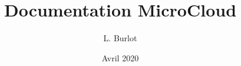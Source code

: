 \documentclass{article}
\title{Documentation MicroCloud}
\author{L. Burlot}
\date{Avril 2020}
\begin{document}
\maketitle
\sloppy
\newpage

\tableofcontents
\newpage




















\end{document}

